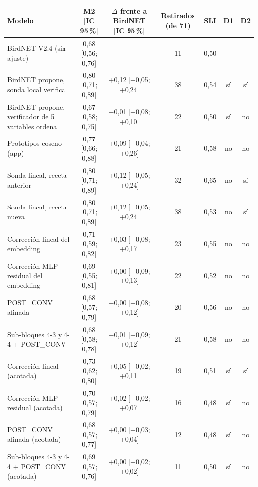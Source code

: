 \begin{tabular}{lcccccc}
\toprule
Modelo & M2 [IC 95\,\%] & $\Delta$ frente a BirdNET [IC 95\,\%] & Retirados (de 71) & SLI & D1 & D2\\
\midrule
BirdNET V2.4 (sin ajuste) & 0{,}68 [0{,}56; 0{,}76] & -- & 11 & 0{,}50 & -- & --\\
\addlinespace
BirdNET propone, sonda local verifica & 0{,}80 [0{,}71; 0{,}89] & +0{,}12 [+0{,}05; +0{,}24] & 38 & 0{,}54 & s\'i & s\'i\\
BirdNET propone, verificador de 5 variables ordena & 0{,}67 [0{,}58; 0{,}75] & $-$0{,}01 [$-$0{,}08; +0{,}10] & 22 & 0{,}50 & s\'i & no\\
Prototipos coseno (app) & 0{,}77 [0{,}66; 0{,}88] & +0{,}09 [$-$0{,}04; +0{,}26] & 21 & 0{,}58 & no & no\\
Sonda lineal, receta anterior & 0{,}80 [0{,}71; 0{,}89] & +0{,}12 [+0{,}05; +0{,}24] & 32 & 0{,}65 & no & s\'i\\
Sonda lineal, receta nueva & 0{,}80 [0{,}71; 0{,}89] & +0{,}12 [+0{,}05; +0{,}24] & 38 & 0{,}53 & no & s\'i\\
\addlinespace
Correcci\'on lineal del embedding & 0{,}71 [0{,}59; 0{,}82] & +0{,}03 [$-$0{,}08; +0{,}17] & 23 & 0{,}55 & no & no\\
Correcci\'on MLP residual del embedding & 0{,}69 [0{,}55; 0{,}81] & +0{,}00 [$-$0{,}09; +0{,}13] & 22 & 0{,}52 & no & no\\
POST\_CONV afinada & 0{,}68 [0{,}57; 0{,}79] & $-$0{,}00 [$-$0{,}08; +0{,}12] & 20 & 0{,}56 & no & no\\
Sub-bloques 4-3 y 4-4 + POST\_CONV & 0{,}68 [0{,}58; 0{,}78] & $-$0{,}01 [$-$0{,}09; +0{,}12] & 21 & 0{,}58 & no & no\\
Correcci\'on lineal (acotada) & 0{,}73 [0{,}62; 0{,}80] & +0{,}05 [+0{,}02; +0{,}11] & 19 & 0{,}51 & s\'i & s\'i\\
Correcci\'on MLP residual (acotada) & 0{,}70 [0{,}57; 0{,}79] & +0{,}02 [$-$0{,}02; +0{,}07] & 16 & 0{,}48 & s\'i & no\\
POST\_CONV afinada (acotada) & 0{,}68 [0{,}57; 0{,}77] & +0{,}00 [$-$0{,}03; +0{,}04] & 12 & 0{,}48 & s\'i & no\\
Sub-bloques 4-3 y 4-4 + POST\_CONV (acotada) & 0{,}69 [0{,}57; 0{,}76] & +0{,}00 [$-$0{,}02; +0{,}02] & 11 & 0{,}50 & s\'i & no\\
\bottomrule
\end{tabular}
